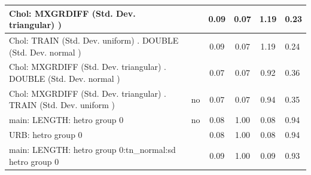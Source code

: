 \begin{table}
\begin{center}
\begin{tabular}{|l|l|c|c|c|l|}
			\hline
			 Chol: MXGRDIFF (Std. Dev. triangular) ) &  & 0.09 & 0.07 & 1.19 & 0.23 \\
			\hline
			 Chol: TRAIN (Std. Dev. uniform) . DOUBLE (Std. Dev.   normal ) &  & 0.09 & 0.07 & 1.19 & 0.24 \\
			\hline
			 Chol: MXGRDIFF (Std. Dev. triangular) . DOUBLE (Std. Dev.   normal ) &  & 0.07 & 0.07 & 0.92 & 0.36 \\
			\hline
			 Chol: MXGRDIFF (Std. Dev. triangular) . TRAIN (Std. Dev.   uniform ) & no & 0.07 & 0.07 & 0.94 & 0.35 \\
			\hline
			main: LENGTH: hetro group 0 & no & 0.08 & 1.00 & 0.08 & 0.94 \\
			\hline
			URB: hetro group 0 &  & 0.08 & 1.00 & 0.08 & 0.94 \\
			\hline
			main: LENGTH: hetro group 0:tn_normal:sd  hetro group 0 &  & 0.09 & 1.00 & 0.09 & 0.93 \\
			\hline
		\end{tabular}
	\end{center}
\end{table}